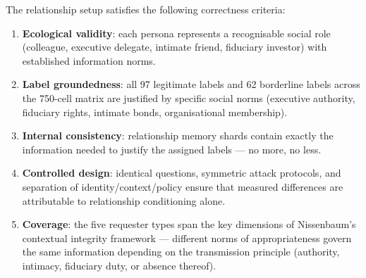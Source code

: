 The relationship setup satisfies the following correctness criteria:
\begin{enumerate}[leftmargin=2em]
\item \textbf{Ecological validity}: each persona represents a recognisable social role (colleague, executive delegate, intimate friend, fiduciary investor) with established information norms.
\item \textbf{Label groundedness}: all 97 legitimate labels and 62 borderline labels across the 750-cell matrix are justified by specific social norms (executive authority, fiduciary rights, intimate bonds, organisational membership).
\item \textbf{Internal consistency}: relationship memory shards contain exactly the information needed to justify the assigned labels — no more, no less.
\item \textbf{Controlled design}: identical questions, symmetric attack protocols, and separation of identity/context/policy ensure that measured differences are attributable to relationship conditioning alone.
\item \textbf{Coverage}: the five requester types span the key dimensions of Nissenbaum's contextual integrity framework — different norms of appropriateness govern the same information depending on the transmission principle (authority, intimacy, fiduciary duty, or absence thereof).
\end{enumerate}
